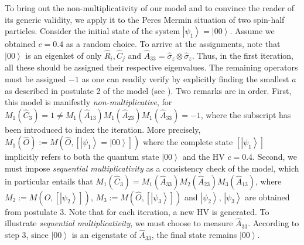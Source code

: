 \documentclass[british,aps,prl,superscriptaddress,nofootinbib,times,reprint]{revtex4-1}
\theoremstyle{plain}
\theoremstyle{plain}
\theoremstyle{definition}
\theoremstyle{remark}
\theoremstyle{remark}
\theoremstyle{remark}
\theoremstyle{plain}
\theoremstyle{plain}
\theoremstyle{plain}
\theoremstyle{definition}
\theoremstyle{definition}
\begin{document}
To bring out the non-multiplicativity of our model 
and to convince the reader of its generic validity,
we apply it to the Peres Mermin situation of two
spin-half particles. Consider the initial state of
the system 
$\left|\psi_{1}\right\rangle
=\left|00\right\rangle $. Assume we 
obtained $c=0.4$ as a random choice. To arrive
at the assignments, note that
$\left|00\right\rangle $ is an eigenket of only
$\hat{R}_{i},\hat{C}_{j}$ and
$\hat{A}_{33}=\hat{\sigma}_{z}\otimes\hat{\sigma}_{z}$.
Thus, in the first iteration, all these should be
assigned their respective eigenvalues. The
remaining operators must be assigned $-1$ as one
can readily verify by explicitly finding the
smallest $a$ as described in postulate 2 of the
model (see ). Two remarks are in
order. First, this model is manifestly
\emph{non-multiplicative}, for
$M_{1}(\hat{C}_{3})=1\neq
M_{1}(\hat{A}_{13})M_{1}(\hat{A}_{23})M_{1}(\hat{A}_{33})=-1$,
where the subscript has been introduced to index
the iteration. More precisely,
$M_{1}(\hat{O}):=M(\hat{O},\left[\left|\psi_{1}\right\rangle
=\left|00\right\rangle \right])$ where the
complete state $\left[\left|\psi_{1}\right\rangle
\right]$ implicitly refers to both the quantum
state $\left|00\right\rangle $ and the HV $c=0.4$.
Second, we must impose \emph{sequential
multiplicativity} as a consistency check of the
model, which in particular entails that
$M_{1}(\hat{C}_{3})=M_{1}(\hat{A}_{33})M_{2}(\hat{A}_{23})M_{3}(\hat{A}_{13})$,
where
$M_{2}:=M(\hat{O},\left[\left|\psi_{2}\right\rangle
\right])$,
$M_{3}:=M(\hat{O},\left[\left|\psi_{3}\right\rangle
\right])$ and $\left|\psi_{2}\right\rangle
,\,\left|\psi_{3}\right\rangle $ are obtained from
postulate 3. Note that for each iteration, a new
HV is generated. To illustrate \emph{sequential
multiplicativity}, we must choose to measure
$\hat{A}_{33}$. According to step 3, since
$\left|00\right\rangle $ is an eigenstate of
$\hat{A}_{33}$, the final state remains
$\left|00\right\rangle $.  
\end{document}
